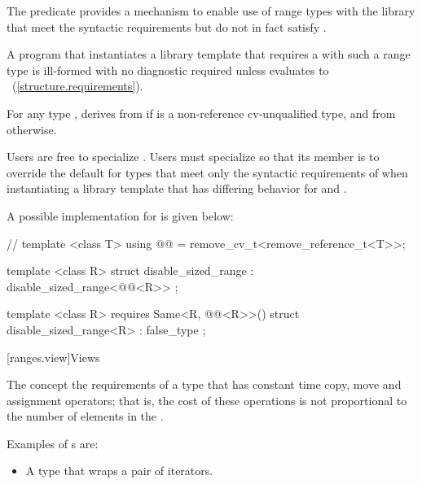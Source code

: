 \begin{addedblock}
\begin{itemdescr}
{\pnum
The  predicate provides a mechanism to enable use
of range types with the library that meet the syntactic requirements but do
not in fact satisfy .

\pnum
\enternote A program that instantiates a library template that requires a
 with such a range type  is ill-formed with no
diagnostic required unless
 evaluates
to ~(\ref{structure.requirements}). \exitnote
} %

{\color{oldclr}
\pnum
For any type , 
derives from  if 
is a non-reference cv-unqualified type, and from
 otherwise.

\pnum
Users are free to specialize .
\enternote Users must specialize
 so that its member
 is  to override the default for  types that meet only the
syntactic requirements of  when instantiating a library
template that has differing behavior for  and . \exitnote

\pnum
\enternote A possible implementation for
 is given below:

\begin{codeblock}
// \expos
template <class T>
using @@ = remove_cv_t<remove_reference_t<T>>;

template <class R>
struct disable_sized_range :
  disable_sized_range<@@<R>> { };

template <class R>
  requires Same<R, @@<R>>()
struct disable_sized_range<R> : false_type { };
\end{codeblock}
\exitnote
} %
\end{itemdescr}

[ranges.view]{Views}

\pnum
The  concept  the requirements of a
 type that has constant time copy, move and assignment operators; that
is, the cost of these operations is not proportional to the number of elements in
the .

\pnum
\enterexample
Examples of s are:

\begin{itemize}
\item A  type that wraps a pair of iterators.


\end{itemize}
\end{addedblock}
